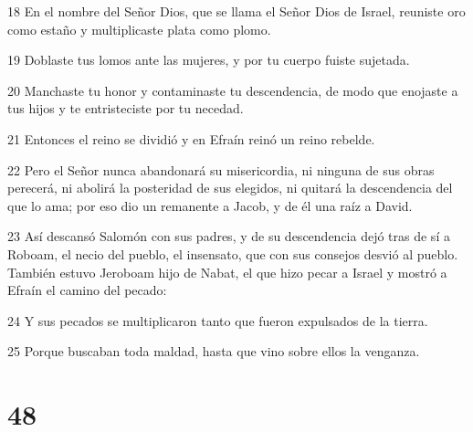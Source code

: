 \par 18 En el nombre del Señor Dios, que se llama el Señor Dios de Israel, reuniste oro como estaño y multiplicaste plata como plomo.
\par 19 Doblaste tus lomos ante las mujeres, y por tu cuerpo fuiste sujetada.
\par 20 Manchaste tu honor y contaminaste tu descendencia, de modo que enojaste a tus hijos y te entristeciste por tu necedad.
\par 21 Entonces el reino se dividió y en Efraín reinó un reino rebelde.
\par 22 Pero el Señor nunca abandonará su misericordia, ni ninguna de sus obras perecerá, ni abolirá la posteridad de sus elegidos, ni quitará la descendencia del que lo ama; por eso dio un remanente a Jacob, y de él una raíz a David.
\par 23 Así descansó Salomón con sus padres, y de su descendencia dejó tras de sí a Roboam, el necio del pueblo, el insensato, que con sus consejos desvió al pueblo. También estuvo Jeroboam hijo de Nabat, el que hizo pecar a Israel y mostró a Efraín el camino del pecado:
\par 24 Y sus pecados se multiplicaron tanto que fueron expulsados ​​de la tierra.
\par 25 Porque buscaban toda maldad, hasta que vino sobre ellos la venganza.

\chapter{48}

